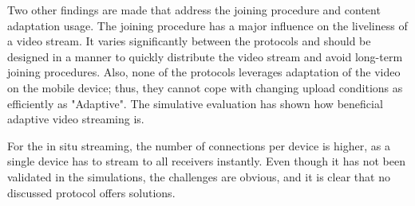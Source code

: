 Two other findings are made that address the joining procedure and content adaptation usage. The joining procedure has a major influence on the liveliness of a video stream. It varies significantly between the protocols and should be designed in a manner to quickly distribute the video stream and avoid long-term joining procedures.
Also, none of the protocols leverages adaptation of the video on the mobile device; thus, they cannot cope with changing upload conditions as efficiently as "Adaptive".
The simulative evaluation has shown how beneficial adaptive video streaming is.

For the in situ streaming, the number of connections per device is higher, as a single device has to stream to all receivers instantly.
Even though it has not been validated in the simulations, the challenges are obvious, and it is clear that no discussed protocol offers solutions.